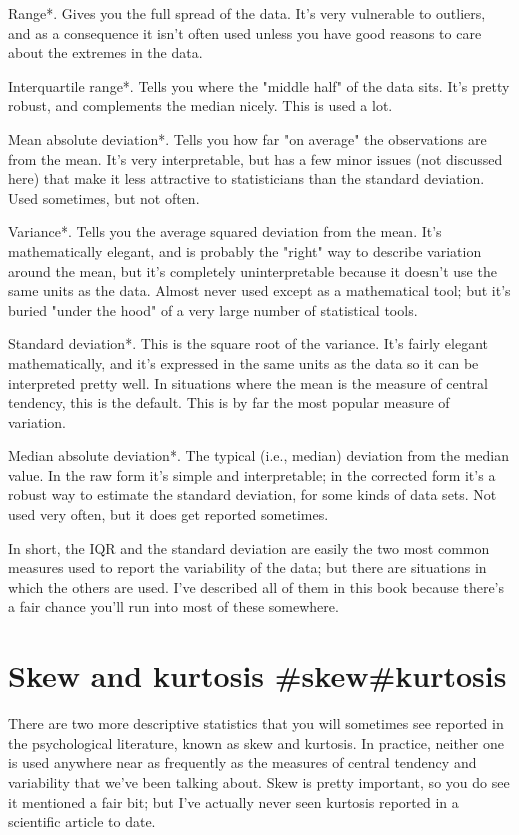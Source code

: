 \item *Range*. Gives you the full spread of the data. It's very vulnerable to outliers, and as a consequence it isn't often used unless you have good reasons to care about the extremes in the data.
\item *Interquartile range*. Tells you where the "middle half" of the data sits. It's pretty robust, and complements the median nicely. This is used a lot.
\item *Mean absolute deviation*. Tells you how far "on average" the observations are from the mean. It's very interpretable, but has a few minor issues (not discussed here) that make it less attractive to statisticians than the standard deviation. Used sometimes, but not often.
\item *Variance*. Tells you the average squared deviation from the mean. It's mathematically elegant, and is probably the "right" way to describe variation around the mean, but it's completely uninterpretable because it doesn't use the same units as the data. Almost never used except as a mathematical tool; but it's buried "under the hood" of a very large number of statistical tools.
\item *Standard deviation*. This is the square root of the variance. It's fairly elegant mathematically, and it's expressed in the same units as the data so it can be interpreted pretty well. In situations where the mean is the measure of central tendency, this is the default. This is by far the most popular measure of variation. 
\item *Median absolute deviation*. The typical (i.e., median) deviation from the median value. In the raw form it's simple and interpretable; in the corrected form it's a robust way to estimate the standard deviation, for some kinds of data sets. Not used very often, but it does get reported sometimes.



In short, the IQR and the standard deviation are easily the two most common measures used to report the variability of the data; but there are situations in which the others are used. I've described all of them in this book because there's a fair chance you'll run into most of these somewhere.

\section{Skew and kurtosis {#skew}{#kurtosis}}

There are two more descriptive statistics that you will sometimes see reported in the psychological literature, known as skew and kurtosis. In practice, neither one is used anywhere near as frequently as the measures of central tendency and variability that we've been talking about. Skew is pretty important, so you do see it mentioned a fair bit; but I've actually never seen kurtosis reported in a scientific article to date. 


